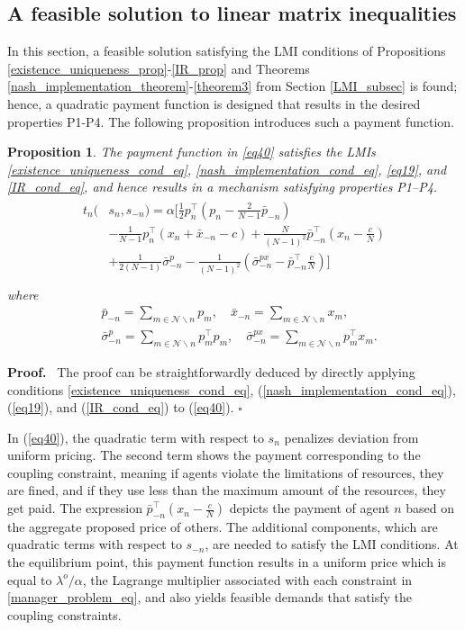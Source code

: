 \documentclass[twocolumn]{autart}
\newtheorem{proposition}{Proposition}
\newenvironment{proof}[1][Proof]{%
  \par\noindent\textbf{#1.}\ }{%
  \hfill$\square$\par
}
\begin{document}
\subsection{A feasible solution to linear matrix inequalities}
In this section, a feasible solution satisfying the LMI conditions of Propositions \ref{existence_uniqueness_prop}-\ref{IR_prop} and Theorems \ref{nash_implementation_theorem}-\ref{theorem3} from Section \ref{LMI_subsec} is found; hence, a quadratic payment function is designed that results in the desired properties P1-P4. The following proposition introduces such a payment function.
\begin{proposition}\label{prop2}
	The payment function in \eqref{eq40} satisfies the LMIs \eqref{existence_uniqueness_cond_eq}, \eqref{nash_implementation_cond_eq}, \eqref{eq19}, and \eqref{IR_cond_eq}, and hence results in a mechanism satisfying properties P1–P4.
	\begin{equation}\label{eq40}
	\begin{aligned}
	\begin{split}
	t_n(&s_n, s_{-n})=\alpha\bigg[\frac{1}{2}p_n^\top(p_n-\frac{2}{N-1}\bar{p}_{-n})\\&-\frac{1}{N-1}p_n^\top(x_n+\bar{x}_{-n}-c)+\frac{N}{(N-1)^2}\bar{p}_{-n}^\top(x_n-\frac{c}{N})\\&+\frac{1}{2(N-1)}\bar{\sigma}_{-n}^p-\frac{1}{(N-1)^2}(\bar{\sigma}_{-n}^{px}-\bar{p}_{-n}^\top\frac{c}{N})\bigg]\\
	\end{split}
	\end{aligned}
	\end{equation}
	where 
    \begin{align*}
        &\bar{p}_{-n}=\sum_{m\in\mathcal{N}\backslash n}{p_m}, \quad \bar{x}_{-n}=\sum_{m\in\mathcal{N}\backslash n}{x_m},\\
        &\bar{\sigma}_{-n}^p=\sum_{m\in\mathcal{N}\backslash n}{p_m^\top p_m},\quad \bar{\sigma}_{-n}^{px}=\sum_{m\in\mathcal{N}\backslash n}{p_m^\top x_m}.
    \end{align*}
\end{proposition}
\begin{proof}
	The proof can be straightforwardly deduced by directly applying conditions \eqref{existence_uniqueness_cond_eq}, (\ref{nash_implementation_cond_eq}), (\ref{eq19}), and (\ref{IR_cond_eq}) to (\ref{eq40}).
\end{proof}
In (\ref{eq40}), the quadratic term with respect to $s_n$ penalizes deviation from uniform pricing. The second term shows the payment corresponding to the coupling constraint, meaning if agents violate the limitations of resources, they are fined, and if they use less than the maximum amount of the resources, they get paid. The expression $\bar{p}_{-n}^\top(x_n-\frac{c}{N})$  depicts the payment of agent $n$ based on the aggregate proposed price of others. The additional components, which are quadratic terms with respect to $s_{-n}$, are needed to satisfy the LMI conditions. At the equilibrium point, this payment function results in a uniform price which is equal to $\lambda^o/\alpha$, the Lagrange multiplier associated with each constraint in \eqref{manager_problem_eq}, and also yields feasible demands that satisfy the coupling constraints. 
\end{document}
